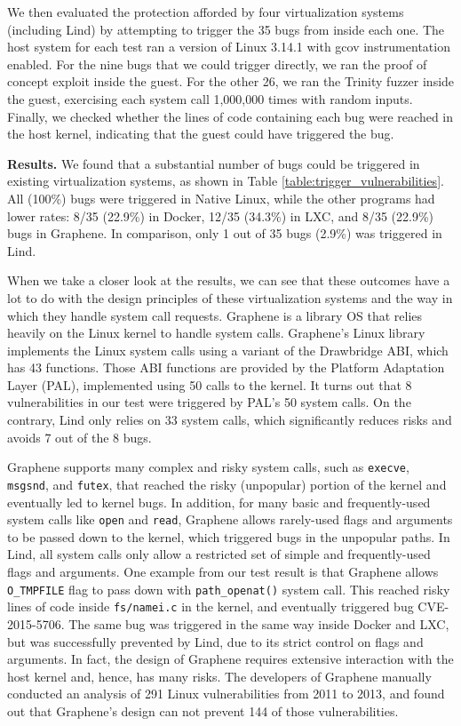 {{{We then evaluated the protection afforded by four virtualization systems (including Lind) by attempting to trigger the 35 bugs from inside each one.
The host system for each test ran a version of Linux 3.14.1 with gcov instrumentation enabled.
For the nine bugs that we could trigger directly, we ran the proof of concept exploit inside the guest.
For the other 26, we ran the Trinity fuzzer inside the guest, exercising each system call 1,000,000 times with random inputs.
Finally, we checked whether the lines of code containing each bug were reached in the host kernel,
indicating that the guest could have triggered the bug.

\noindent
\textbf{Results.}
We found that a substantial number of bugs could be triggered in existing
virtualization systems, as shown in Table \ref{table:trigger_vulnerabilities}.
All (100\%) bugs were triggered in Native Linux,
while the other programs had lower rates: 8/35 (22.9\%)  in Docker,
12/35 (34.3\%)  in LXC, and 8/35 (22.9\%) bugs in Graphene.
In comparison, only 1 out of 35 bugs  (2.9\%) was triggered in Lind.

When we take a closer look at the results, we can see that these outcomes
have a lot to do with the design principles of these virtualization systems and
the way in which they handle system call requests.
Graphene \cite{Graphene-14} is a library OS that relies heavily on the Linux kernel to handle system calls.
Graphene's Linux library implements the Linux system calls using a variant of the
Drawbridge \cite{Drawbridge-11} ABI, which has 43 functions. Those ABI functions
are provided by the Platform Adaptation Layer (PAL), implemented using 50 calls
to the kernel. It turns out that 8 vulnerabilities in our test were triggered by PAL's
50 system calls. On the contrary, Lind only relies on 33 system calls, which significantly reduces
risks and avoids 7 out of the 8 bugs.

Graphene supports many complex and risky system calls, such as \texttt{execve}, \texttt{msgsnd}, and \texttt{futex},
that reached the risky (unpopular) portion of the kernel and eventually led to kernel bugs.
In addition, for many basic and frequently-used system calls like \texttt{open} and \texttt{read},
Graphene allows rarely-used flags and arguments to be passed down to the kernel, which triggered bugs in
the unpopular paths.
In Lind, all system calls only allow a restricted set of simple and frequently-used flags and arguments.
One example from our test result is that Graphene allows \texttt{O\_TMPFILE} flag to pass down with
\texttt{path\_openat()} system call. This reached risky lines of code inside \texttt{fs/namei.c} in the kernel,
and eventually triggered bug CVE-2015-5706.
The same bug was triggered in the same way inside Docker and LXC, but was successfully prevented by Lind,
due to its strict control on flags and arguments.
In fact, the design of Graphene requires extensive interaction
with the host kernel and, hence, has many risks. The developers of Graphene manually conducted
an analysis of 291 Linux vulnerabilities from 2011 to 2013, and found out that Graphene's design can not prevent 144 of those vulnerabilities.

}}}
